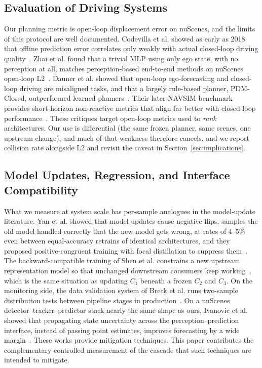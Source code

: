 \documentclass[conference]{IEEEtran}
\begin{document}
\subsection{Evaluation of Driving Systems}
Our planning metric is open-loop displacement error on nuScenes, and the
limits of this protocol are well documented. Codevilla et al. showed as early
as 2018 that offline prediction error correlates only weakly with actual
closed-loop driving quality~\cite{codevilla2018offline}. Zhai et al. found
that a trivial MLP using only ego state, with no perception at all, matches
perception-based end-to-end methods on nuScenes open-loop
L2~\cite{zhai2023rethinking}. Dauner et al. showed that open-loop
ego-forecasting and closed-loop driving are misaligned tasks, and that a
largely rule-based planner, PDM-Closed, outperformed learned
planners~\cite{dauner2023parting}. Their later NAVSIM benchmark provides
short-horizon non-reactive metrics that align far better with closed-loop
performance~\cite{dauner2024navsim}. These critiques target open-loop metrics
used to \emph{rank} architectures. Our use is differential (the same frozen
planner, same scenes, one upstream change), and much of that weakness therefore cancels,
and we report collision rate alongside L2 and revisit the caveat in
Section~\ref{sec:implications}.

\subsection{Model Updates, Regression, and Interface Compatibility}
What we measure at system scale has per-sample analogues in the model-update
literature. Yan et al. showed that model updates cause negative flips, samples
the old model handled correctly that the new model gets wrong, at rates of
4--5\% even between equal-accuracy retrains of identical architectures, and
they proposed positive-congruent training with focal distillation to suppress
them~\cite{yan2021pctraining}. The backward-compatible training of Shen et al.
constrains a new upstream representation model so that unchanged downstream
consumers keep working~\cite{shen2020bct}, which is the same situation as
updating $C_1$ beneath a frozen $C_2$ and $C_3$. On the monitoring side, the data
validation system of Breck et al. runs two-sample distribution tests between
pipeline stages in production~\cite{breck2019data}. On a nuScenes
detector--tracker--predictor stack nearly the same shape as ours, Ivanovic et
al. showed that propagating state uncertainty across the
perception--prediction interface, instead of passing point estimates, improves
forecasting by a wide margin~\cite{ivanovic2022propagating}. These works
provide mitigation techniques. This paper contributes the complementary
controlled measurement of the cascade that such techniques are intended to
mitigate.
\end{document}
